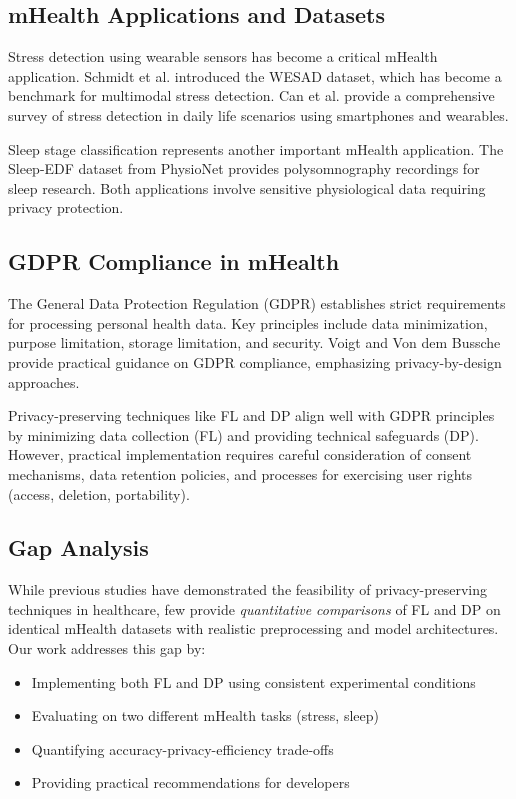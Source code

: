 \documentclass[conference]{IEEEtran}
\begin{document}
\subsection{mHealth Applications and Datasets}

Stress detection using wearable sensors has become a critical mHealth application. Schmidt et al. \cite{schmidt2018wesad} introduced the WESAD dataset, which has become a benchmark for multimodal stress detection. Can et al. \cite{can2019stress} provide a comprehensive survey of stress detection in daily life scenarios using smartphones and wearables.

Sleep stage classification represents another important mHealth application. The Sleep-EDF dataset \cite{kemp2000analysis} from PhysioNet \cite{goldberger2000physiobank} provides polysomnography recordings for sleep research. Both applications involve sensitive physiological data requiring privacy protection.

\subsection{GDPR Compliance in mHealth}

The General Data Protection Regulation (GDPR) \cite{voigt2017gdpr} establishes strict requirements for processing personal health data. Key principles include data minimization, purpose limitation, storage limitation, and security. Voigt and Von dem Bussche provide practical guidance on GDPR compliance, emphasizing privacy-by-design approaches.

Privacy-preserving techniques like FL and DP align well with GDPR principles by minimizing data collection (FL) and providing technical safeguards (DP). However, practical implementation requires careful consideration of consent mechanisms, data retention policies, and processes for exercising user rights (access, deletion, portability).

\subsection{Gap Analysis}

While previous studies have demonstrated the feasibility of privacy-preserving techniques in healthcare, few provide \textit{quantitative comparisons} of FL and DP on identical mHealth datasets with realistic preprocessing and model architectures. Our work addresses this gap by:

\begin{itemize}
    \item Implementing both FL and DP using consistent experimental conditions
    \item Evaluating on two different mHealth tasks (stress, sleep)
    \item Quantifying accuracy-privacy-efficiency trade-offs
    \item Providing practical recommendations for developers
\end{itemize}
\end{document}
